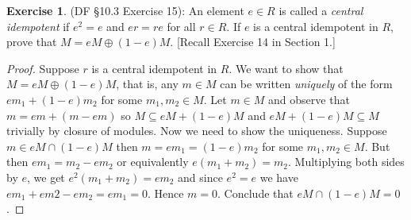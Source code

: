\documentclass[8pt]{amsart}
\theoremstyle{plain}%
\theoremstyle{definition}
\newtheorem*{exercise}{Exercise}%
\theoremstyle{remark}
\numberwithin{equation}{section}
\begin{document}
\begin{exercise}
(DF \S 10.3 Exercise 15): An element $e \in R$ is called a \textit{central idempotent} if $e^2 = e$ and $er = re$ for all $r \in R$. If $e$ is a central idempotent in $R$, prove that $M = eM \oplus (1 - e)M$. [Recall Exercise 14 in Section 1.]
	\begin{proof}
		Suppose $r$ is a central idempotent in $R$. We want to show that $M = eM \oplus (1 - e)M$, that is, any $m \in M$ can be written \textit{uniquely} of the form $em_1 + (1 - e)m_2$ for some $m_1, m_2 \in M$. Let $m \in M$ and observe that $m = em + (m - em)$ so $M \subseteq eM + (1 - e)M$ and $eM + (1 - e)M \subseteq M$ trivially by closure of modules. Now we need to show the uniqueness. Suppose $m \in eM \cap (1 - e)M$ then $m = em_1 = (1 - e)m_2$ for some $m_1, m_2 \in M$. But then $em_1 = m_2 - em_2$ or equivalently $e(m_1 + m_2) = m_2$. Multiplying both sides by $e$, we get $e^2(m_1 + m_2) = em_2$ and since $e^2 = e$ we have $em_1 + em2 - em_2 = em_1 = 0$. Hence $m = 0$. Conclude that $eM \cap (1 - e)M = 0$.
	\end{proof}
\end{exercise}
\end{document}
